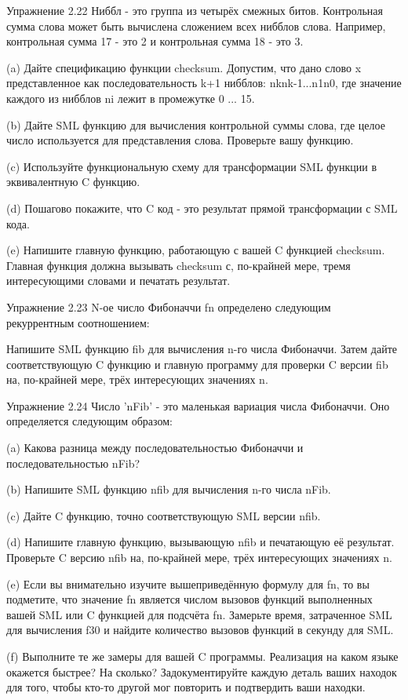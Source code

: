 Упражнение 2.22 Ниббл - это группа из четырёх смежных битов. Контрольная сумма слова может быть вычислена сложением всех нибблов слова. Например, контрольная сумма 17 - это 2 и контрольная сумма 18 - это 3.

(a) Дайте спецификацию функции checksum. Допустим, что дано слово x представленное как последовательность k+1 нибблов: nknk-1...n1n0, где значение каждого из нибблов ni лежит в промежутке 0 ... 15.

(b) Дайте SML функцию для вычисления контрольной суммы слова, где целое число используется для представления слова. Проверьте вашу функцию.

(c) Используйте функциональную схему для трансформации SML функции в эквивалентную C функцию.

(d) Пошагово покажите, что C код - это результат прямой трансформации с SML кода.

(e) Напишите главную функцию, работающую с вашей C функцией checksum. Главная функция должна вызывать checksum с, по-крайней мере, тремя интересующими словами и печатать результат.

Упражнение 2.23 N-ое число Фибоначчи fn определено следующим рекуррентным соотношением:

Напишите SML функцию fib для вычисления n-го числа Фибоначчи. Затем дайте соответствующую C функцию и главную программу для проверки C версии fib на, по-крайней мере, трёх интересующих значениях n.

Упражнение 2.24 Число 'nFib' - это маленькая вариация числа Фибоначчи. Оно определяется следующим образом:

(a) Какова разница между последовательностью Фибоначчи и последовательностью nFib?

(b) Напишите SML функцию nfib для вычисления n-го числа nFib.

(c) Дайте C функцию, точно соответствующую SML версии nfib.

(d) Напишите главную функцию, вызывающую nfib и печатающую её результат. Проверьте C версию nfib на, по-крайней мере, трёх интересующих значениях n.

(e) Если вы внимательно изучите вышеприведённую формулу для fn, то вы подметите, что значение fn является числом вызовов функций выполненных вашей SML или C функцией для подсчёта fn. Замерьте время, затраченное SML для вычисления f30 и найдите количество вызовов функций в секунду для SML.

(f) Выполните те же замеры для вашей C программы. Реализация на каком языке окажется быстрее? На сколько? Задокументируйте каждую деталь ваших находок для того, чтобы кто-то другой мог повторить и подтвердить ваши находки.

